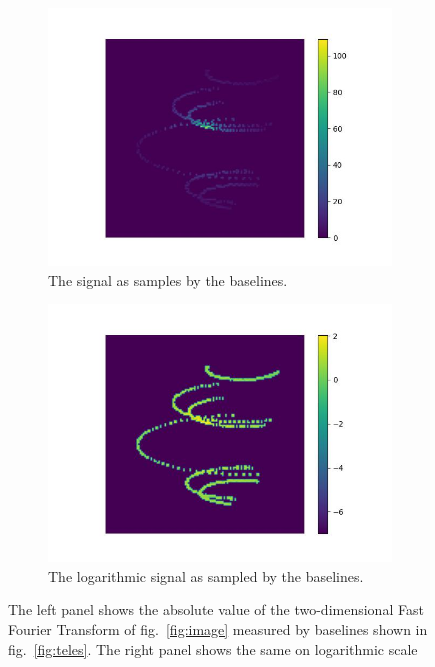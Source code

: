 \begin{figure}
	\centering
	\begin{subfigure}{0.5\linewidth}
		\includegraphics[width=\linewidth]{fig/ft/ft_base.jpg}
		\caption{The signal as samples by the baselines.}
	\end{subfigure}\hfill
	\begin{subfigure}{0.5\linewidth}
		\includegraphics[width=\linewidth]{fig/ft/ft_log_base.jpg}
		\caption{The logarithmic signal as sampled by the baselines.}
	\end{subfigure}
	\caption{The left panel shows the absolute value of the two-dimensional Fast Fourier Transform of fig.~\ref{fig:image} measured by baselines shown in fig.~\ref{fig:teles}. The right panel shows the same on logarithmic scale}
	\label{fig:ft_base}
\end{figure}
